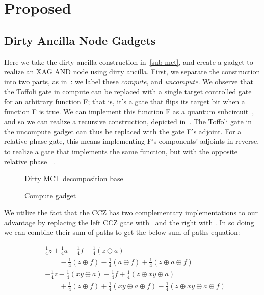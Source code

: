\section{Proposed}
\label{Pro}

\subsection{Dirty Ancilla Node Gadgets}
\label{sub-synth}
Here we take the dirty ancilla construction in~\ref{sub-mct}, and create a gadget to
realize an XAG AND node using dirty ancilla. First, we separate the construction into
two parts, as in~: we label these \emph{compute}, and \emph{uncompute}.
We observe that the Toffoli gate in compute can be replaced with a single target controlled
gate for an arbitrary function F; that is, it's a gate that flips its target bit when a
function F is true. We can implement this function F as a quantum
subcircuit~\cite{bib-amy-phase-state}, and so we can realize a recursive construction, depicted
in~. The Toffoli gate in the uncompute gadget can thus be replaced with the
gate F's adjoint. For a relative phase gate, this means implementing F's components' adjoints in
reverse, to realize a gate that implements the same function, but with the opposite relative phase
~\cite{bib-maslov-rtof}.

\begin{figure}[t]
  \centering
  \scalebox{1.0} {
    
  }
  \caption{Dirty MCT decomposition base}
  \label{fig-dirt-mct-org}
\end{figure}

\begin{figure}[t]
  \centering
  \scalebox{1.0} {
    
  }
  \caption{Compute gadget}
  \label{fig-compute}
\end{figure}

We utilize the fact that the CCZ has two complementary implementations to our advantage by replacing the left CCZ
gate with~ and the right with . In so doing we can combine their
sum-of-paths to get the below sum-of-paths equation:

\begin{equation}
  \label{eq-toff-tot}
  \begin{aligned}
    &\frac{1}{4}z + \frac{1}{4}a + \frac{1}{4}f - \frac{1}{4}(z \oplus a) \\
    &\qquad -\frac{1}{4}(z \oplus f) - \frac{1}{4}(a \oplus f) + \frac{1}{4}(z \oplus a \oplus f)\\
    &- \frac{1}{4}z - \frac{1}{4}(xy \oplus a) - \frac{1}{4} f + \frac{1}{4}(z \oplus xy \oplus a) \\
    &\qquad + \frac{1}{4}(z \oplus f) + \frac{1}{4}(xy \oplus a \oplus f) - \frac{1}{4}(z \oplus xy \oplus a \oplus f)
  \end{aligned}
\end{equation}

